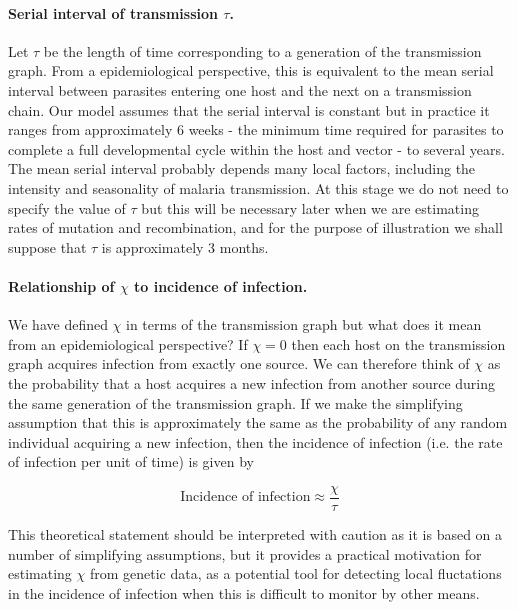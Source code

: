 \documentclass[_main.tex]{subfiles}
\begin{document}
\paragraph{Serial interval of transmission $\tau$.}  \label{main_serial_interval}  Let $\tau$ be the length of time corresponding to a generation of the transmission graph.  From a epidemiological perspective, this is equivalent to the mean serial interval between parasites entering one host and the next on a transmission chain.  Our model assumes that the serial interval is constant but in practice it ranges from approximately 6 weeks - the minimum time required for parasites to complete a full developmental cycle within the host and vector - to several years.  The mean serial interval probably depends many local factors, including the intensity and seasonality of malaria transmission. At this stage we do not need to specify the value of $\tau$ but this will be necessary later when we are estimating rates of mutation and recombination, and for the purpose of illustration we shall suppose that $\tau$ is approximately 3 months.

\paragraph{Relationship of $\chi$ to incidence of infection.} We have defined $\chi$ in terms of the transmission graph but what does it mean from an epidemiological perspective?  If $\chi = 0$ then each host on the transmission graph acquires infection from exactly one source.  We can therefore think of $\chi$ as the probability that a host acquires a new infection from another source during the same generation of the transmission graph.  If we make the simplifying assumption that this is approximately the same as the probability of any random individual acquiring a new infection, then the incidence of infection (i.e. the rate of infection per unit of time) is given by

\begin{equation}
\text{Incidence of infection} \approx \frac{\chi}{\tau}
\label{main:chi_tau} 
\end{equation}

This theoretical statement should be interpreted with caution as it is based on a number of simplifying assumptions, but it provides a practical motivation for estimating $\chi$ from genetic data, as a potential tool for detecting local fluctations in the incidence of infection when this is difficult to monitor by other means.
\end{document}
